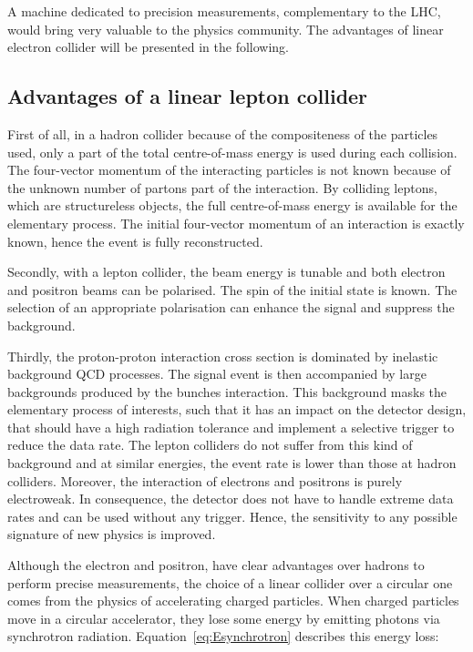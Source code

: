   A machine dedicated to precision measurements, complementary to the \gls{LHC}, would bring very valuable to the physics community.
  The advantages of linear electron collider will be presented in the following.

    \subsection{Advantages of a linear lepton collider}
    \label{subsec:advLLC}
    
    First of all, in a hadron collider because of the compositeness of the particles used, only a part of the total centre-of-mass energy is used during each collision.
    The four-vector momentum  of the interacting particles is not known because of the unknown number of partons part of the interaction.
    By colliding leptons, which are structureless objects, the full centre-of-mass energy is available for the elementary process. 
    The initial four-vector momentum of an interaction is exactly known, hence the event is fully reconstructed.

    Secondly, with a lepton collider, the beam energy is tunable and both electron and positron beams can be polarised. 
    The spin of the initial state is known.
    The selection of an appropriate polarisation can enhance the signal and suppress the background. 

    Thirdly, the proton-proton interaction cross section is dominated by inelastic background QCD processes.
    The signal event is then accompanied by large backgrounds produced by the bunches interaction.
    This background masks the elementary process of interests, such that it has an impact on the detector design, that should have a high radiation tolerance and implement a selective trigger to reduce the data rate.
    The lepton colliders do not suffer from this kind of background and at similar energies, the event rate is lower than those at hadron colliders.
    Moreover, the interaction of electrons and positrons is purely electroweak.
    In consequence, the detector does not have to handle extreme data rates and can be used without any trigger.
    Hence, the sensitivity to any possible signature of new physics is improved.

    Although the electron and positron, have clear advantages over hadrons to perform precise measurements, the choice of a linear collider over a circular one comes from the physics of accelerating charged particles.
    When charged particles move in a circular accelerator, they lose some energy by emitting photons via synchrotron radiation.
    Equation~\ref{eq:Esynchrotron} describes this energy loss:
    
